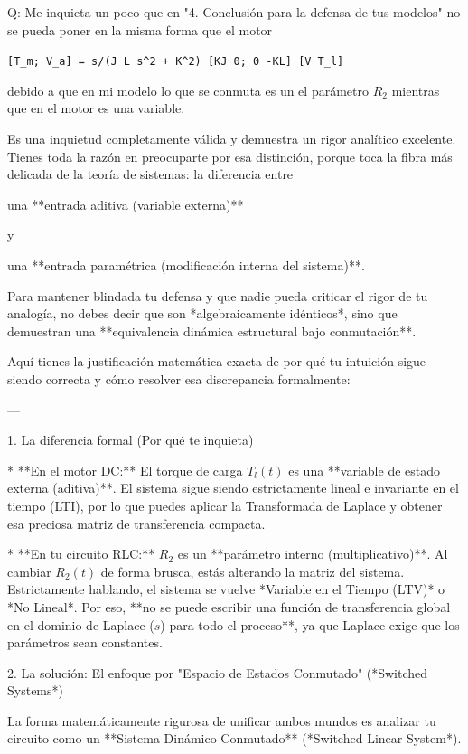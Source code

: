 \documentclass[11pt, a4paper]{article}
\theoremstyle{definition}
\theoremstyle{plain}
\theoremstyle{plain}
\theoremstyle{remark}
\theoremstyle{remark}
\theoremstyle{remark}
\begin{document}
{\color{red} Q: Me inquieta un poco que en "4. Conclusión para la defensa de tus modelos" no se pueda poner en la misma forma que el motor 
	
	\verb|[T_m; V_a] = s/(J L s^2 + K^2) [KJ 0; 0 -KL] [V T_l]|
	
	debido a que en mi modelo lo que se conmuta es un el parámetro $R_2$ mientras que en el motor es una variable.}


Es una inquietud completamente válida y demuestra un rigor analítico excelente. Tienes toda la razón en preocuparte por esa distinción, porque toca la fibra más delicada de la teoría de sistemas: la diferencia entre 

una **entrada aditiva (variable externa)** 

y 

una **entrada paramétrica (modificación interna del sistema)**.

Para mantener blindada tu defensa y que nadie pueda criticar el rigor de tu analogía, {\color{red} no debes decir que son *algebraicamente idénticos*, sino que demuestran una **equivalencia dinámica estructural bajo conmutación**.}

Aquí tienes la justificación matemática exacta de por qué tu intuición sigue siendo correcta y cómo resolver esa discrepancia formalmente:

---

1. La diferencia formal (Por qué te inquieta)

* **En el motor DC:** El torque de carga $T_l(t)$ es una **variable de estado externa (aditiva)**. El sistema sigue siendo estrictamente lineal e invariante en el tiempo (LTI), por lo que puedes aplicar la Transformada de Laplace y obtener esa preciosa matriz de transferencia compacta.

* **En tu circuito RLC:** $R_2$ es un **parámetro interno (multiplicativo)**. Al cambiar $R_2(t)$ de forma brusca, estás alterando la matriz del sistema. Estrictamente hablando, el sistema se vuelve *Variable en el Tiempo (LTV)* o *No Lineal*. Por eso, **no se puede escribir una función de transferencia global en el dominio de Laplace ($s$) para todo el proceso**, ya que Laplace exige que los parámetros sean constantes.



2. La solución: El enfoque por "Espacio de Estados Conmutado" (*Switched Systems*)

La forma matemáticamente rigurosa de unificar ambos mundos es analizar tu circuito como un **Sistema Dinámico Conmutado** (*Switched Linear System*).
\end{document}

